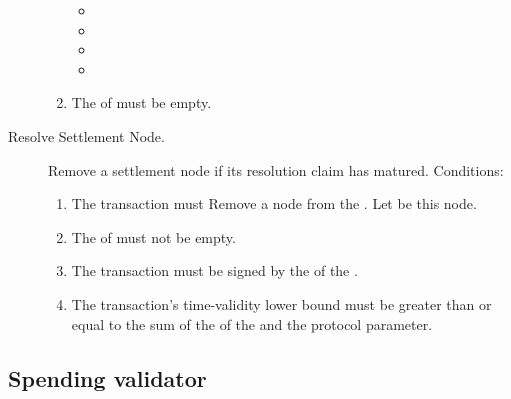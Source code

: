 \documentclass[../midgard.tex]{subfiles}
\begin{document}
\begin{description}
\begin{enumerate}
          \begin{itemize}
            \item {}
            \item {}
            \item {}
            \item {}
          \end{itemize}
        \item The  of  must be empty.
      \end{enumerate}
  \item[Resolve Settlement Node.] Remove a settlement node if its resolution claim has matured.
    Conditions:
      \begin{enumerate}
        \item The transaction must Remove a node from the .
          Let  be this node.
        \item The  of  must not be empty.
        \item The transaction must be signed by the  of the .
        \item The transaction's time-validity lower bound must be greater than or equal to the sum of the  of the  and the  protocol parameter.
      \end{enumerate}
\end{description}

\subsection{Spending validator}
\label{h:settlement-queue-spending-validator}
\end{document}
